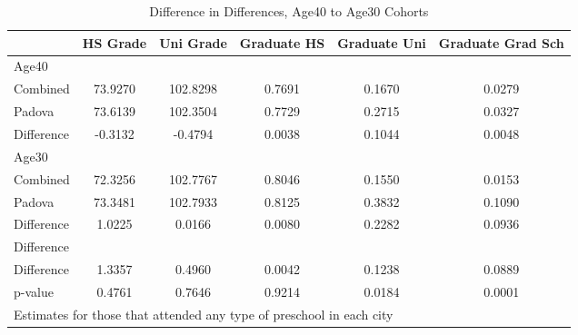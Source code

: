 \begin{table}[htbp]\centering
\caption{Difference in Differences, Age40 to Age30 Cohorts}
\begin{tabular}{l*{5}{c}}
\hline\hline
            &    HS Grade&   Uni Grade& Graduate HS&Graduate Uni&Graduate Grad Sch\\
\hline
Age40       &            &            &            &            &            \\
Combined    &     73.9270&    102.8298&      0.7691&      0.1670&      0.0279\\
Padova      &     73.6139&    102.3504&      0.7729&      0.2715&      0.0327\\
Difference  &     -0.3132&     -0.4794&      0.0038&      0.1044&      0.0048\\
\hline
Age30       &            &            &            &            &            \\
Combined    &     72.3256&    102.7767&      0.8046&      0.1550&      0.0153\\
Padova      &     73.3481&    102.7933&      0.8125&      0.3832&      0.1090\\
Difference  &      1.0225&      0.0166&      0.0080&      0.2282&      0.0936\\
\hline
Difference  &            &            &            &            &            \\
Difference  &      1.3357&      0.4960&      0.0042&      0.1238&      0.0889\\
p-value     &      0.4761&      0.7646&      0.9214&      0.0184&      0.0001\\
\hline\hline
\multicolumn{6}{l}{\footnotesize Estimates for those that attended any type of preschool in each city}\\
\end{tabular}
\end{table}
